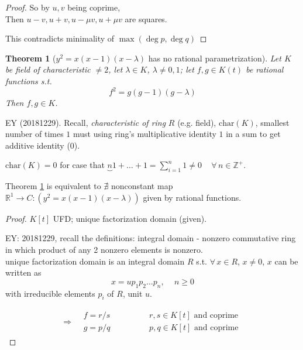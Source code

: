 \documentclass[10pt]{amsart}
\newtheorem{theorem}{Theorem}
\begin{document}
\begin{multicols*}{2}
\begin{proof}
	So by $u,v $ being coprime, \\
	\phantom{ \qquad \, } Then $u-v, u+v, u- \mu v, u + \mu v$ are squares.
	
	This contradicts minimality of $\max{(\deg{p}, \deg{q})}$


\end{proof}	





\begin{theorem}[$y^2 = x(x-1)(x-\lambda)$ has no rational parametrization]\label{Thm:SomeEqnHasNoRationalParametrization}
	Let $K$ be field of characteristic $\neq 2$, let $\lambda \in K$, $\lambda \neq 0, 1$; let $f,g \in K(t)$ be rational functions s.t.\[
	f^2 = g(g-1)(g-\lambda)
	\]
	Then $f, g\in K$. 	
\end{theorem}
	EY (20181229). Recall, \emph{characteristic of ring} $R$ (e.g. field), $\text{char}(K)$, smallest number of times $1$ must using ring's multiplicative identity $1$ in a sum to get additive identity ($0$). 
	
	$\text{char}(K) = 0$ for case that $\underbrace{n}{1 + \dots + 1} = \sum_{i=1}^n 1 \neq 0 \quad \, \forall \, n \in \mathbb{Z}^+$.  

	Theorem \ref{Thm:SomeEqnHasNoRationalParametrization} is equivalent to $\nexists $ nonconstant map $\mathbb{R}^1 \to C : (y^2 = x(x-1)(x-\lambda))$ given by rational functions.
	
	\begin{proof}
$K[t]$ UFD; unique factorization domain (given).

EY: 20181229, recall the definitions:
integral domain - nonzero commutative ring in which product of any 2 nonzero elements is nonzero. \\
unique factorization domain is an integral domain $R$ s.t. $\forall \, x \in R$, $x\neq 0$, $x$ can be written as 
\[
x = u p_1 p_2 \dots p_n , \quad \, n \geq 0
\]		
with irreducible elements $p_i$ of $R$, unit $u$.

\[
\begin{gathered}
\Longrightarrow \begin{aligned} & f = r/s \\ & g = p /q \end{aligned} \qquad \quad \, 
\begin{aligned}
& r,s \in K[t] \text{ and coprime } \\
& p,q \in K[t] \text{ and coprime } 
\end{aligned}
\end{gathered}
\]


\end{proof}
\end{multicols*}
\end{document}
